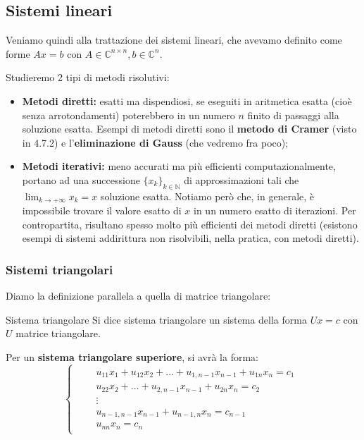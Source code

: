 \documentclass[a4paper,11pt]{article}
\begin{document}
\subsection{Sistemi lineari}
Veniamo quindi alla trattazione dei sistemi lineari, che avevamo definito come forme $Ax = b$ con $A \in \mathbb{C}^{n \times n}, b \in \mathbb{C}^n$.

Studieremo 2 tipi di metodi risolutivi:
\begin{itemize}
	\item \textbf{Metodi diretti:} esatti ma dispendiosi, se eseguiti in aritmetica esatta (cioè senza arrotondamenti) poterebbero in un numero $n$ finito di passaggi alla soluzione esatta.
	Esempi di metodi diretti sono il \textbf{metodo di Cramer} (visto in 4.7.2) e l'\textbf{eliminazione di Gauss} (che vedremo fra poco);
	\item \textbf{Metodi iterativi:} meno accurati ma più efficienti computazionalmente, portano ad una successione $\{x_k\}_{k \in \mathbb{N}}$ di approssimazioni tali che $ \lim_{k \rightarrow +\infty} x_k = x$ soluzione esatta. Notiamo però che, in generale, è impossibile trovare il valore esatto di $x$ in un numero esatto di iterazioni. Per contropartita, risultano spesso molto più efficienti dei metodi diretti (esistono esempi di sistemi addirittura non risolvibili, nella pratica, con metodi diretti). 
\end{itemize}

\subsubsection{Sistemi triangolari}
Diamo la definizione parallela a quella di matrice triangolare:
\begin{definition}{Sistema triangolare}
	Si dice sistema triangolare un sistema della forma $Ux = c$ con $U$ matrice triangolare.
\end{definition}

Per un \textbf{sistema triangolare superiore}, si avrà la forma:
\[
\begin{cases}
    \begin{aligned}
			&& u_{11} x_1 + u_{12} x_2 + ... + u_{1,n-1} x_{n-1} + u_{1n} x_n = c_1 \\
			&&              u_{22} x_2 + ... + u_{2,n-1} x_{n-1} + u_{2n} x_n = c_2 \\
			&& \vdots \\
			&&                                 u_{n-1,n-1} x_{n-1} + u_{n-1,n} x_n = c_{n-1} \\
			&&                                                     u_{nn} x_n = c_n
		\end{aligned}
\end{cases}
\]
\end{document}
